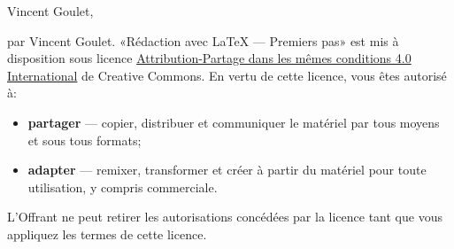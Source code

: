 
\begin{frame}[t,plain,fragile=singleslide]
  \tiny
  \vspace*{10mm}

  \begin{adjustwidth}{10mm}{10mm}
    Vincent Goulet, {\year}

    {\textcopyright} {\year} par Vincent Goulet. «Rédaction avec
    {\LaTeX} --- Premiers pas» est mis à disposition sous licence
    \href{https://creativecommons.org/licenses/by-sa/4.0/deed.fr}{%
      Attribution-Partage dans les mêmes conditions 4.0 International}
    de Creative Commons. En vertu de cette licence, vous êtes autorisé
    à:
    \begin{itemize}
    \item \textbf{partager} --- copier, distribuer et communiquer le
      matériel par tous moyens et sous tous formats;
    \item \textbf{adapter} --- remixer, transformer et créer à partir du
      matériel pour toute utilisation, y compris commerciale.
    \end{itemize}
    L'Offrant ne peut retirer les autorisations concédées par la licence
    tant que vous appliquez les termes de cette licence.


\end{adjustwidth}
\end{frame}
